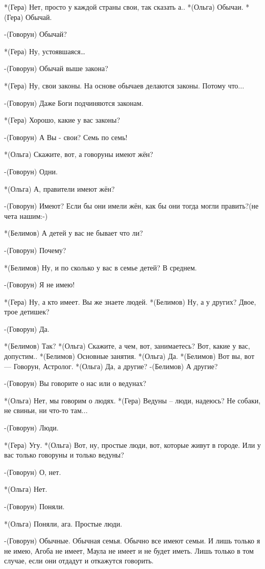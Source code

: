 *(Гера) Нет, просто у каждой страны свои, так сказать а.. 
*(Ольга) Обычаи.
*(Гера) Обычай.

-(Говорун) Обычай?

*(Гера) Ну, устоявшаяся…

-(Говорун) Обычай выше закона?

*(Гера) Ну, свои законы. На основе обычаев делаются законы. Потому что...

-(Говорун) Даже Боги подчиняются законам.

*(Гера) Хорошо, какие у вас законы?

-(Говорун) А Вы - свои? Семь по семь!

*(Ольга) Скажите, вот, а говоруны имеют жён?

-(Говорун) Одни.

*(Ольга) А, правители имеют жён?

-(Говорун) Имеют? Если бы они имели жён, как бы они тогда могли править?(не чета нашим:-)

*(Белимов) А детей у вас не бывает что ли?

-(Говорун) Почему?

*(Белимов) Ну, и по сколько у вас в семье детей? В среднем.

-(Говорун) Я не имею!

*(Гера) Ну, а кто имеет. Вы же знаете людей.
*(Белимов) Ну, а у других? Двое, трое детишек?

-(Говорун) Да.

*(Белимов) Так?
*(Ольга) Скажите, а чем, вот, занимаетесь? Вот, какие у вас, допустим..
*(Белимов) Основные занятия. 
*(Ольга) Да.
*(Белимов) Вот вы, вот — Говорун, Астролог.
*(Ольга) Да, а другие?
-(Белимов) А другие?

-(Говорун) Вы говорите о нас или о ведунах?

*(Ольга) Нет, мы говорим о людях.
*(Гера) Ведуны – люди, надеюсь? Не собаки, не свиньи, ни что-то там...

-(Говорун) Люди.

*(Гера) Угу.
*(Ольга) Вот, ну, простые люди, вот, которые живут в городе.  Или у вас только говоруны и только ведуны?

-(Говорун) О, нет.

*(Ольга) Нет.

-(Говорун) Поняли.

*(Ольга) Поняли, ага. Простые люди.

-(Говорун) Обычные. Обычная семья. Обычно все имеют семьи. И лишь только я не имею, Агоба не имеет, Маула не имеет и не будет иметь. Лишь только в том случае, если они отдадут и откажутся говорить.

